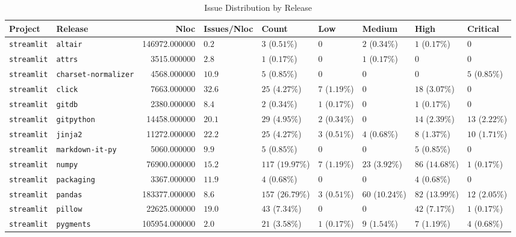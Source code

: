 \begin{table}
\caption{Issue Distribution by Release}
\label{tab:issue-release-distribution}
\begin{tabular}{llrllllll}
\toprule
Project & Release & Nloc & Issues/Nloc & Count & Low & Medium & High & Critical \\
\midrule
\texttt{streamlit} & \texttt{altair} & 146972.000000 & $0.2$ & $3$ ($0.51\%$) & $0$ & $2$ ($0.34\%$) & $1$ ($0.17\%$) & $0$ \\
\texttt{streamlit} & \texttt{attrs} & 3515.000000 & $2.8$ & $1$ ($0.17\%$) & $0$ & $1$ ($0.17\%$) & $0$ & $0$ \\
\texttt{streamlit} & \texttt{charset-normalizer} & 4568.000000 & $10.9$ & $5$ ($0.85\%$) & $0$ & $0$ & $0$ & $5$ ($0.85\%$) \\
\texttt{streamlit} & \texttt{click} & 7663.000000 & $32.6$ & $25$ ($4.27\%$) & $7$ ($1.19\%$) & $0$ & $18$ ($3.07\%$) & $0$ \\
\texttt{streamlit} & \texttt{gitdb} & 2380.000000 & $8.4$ & $2$ ($0.34\%$) & $1$ ($0.17\%$) & $0$ & $1$ ($0.17\%$) & $0$ \\
\texttt{streamlit} & \texttt{gitpython} & 14458.000000 & $20.1$ & $29$ ($4.95\%$) & $2$ ($0.34\%$) & $0$ & $14$ ($2.39\%$) & $13$ ($2.22\%$) \\
\texttt{streamlit} & \texttt{jinja2} & 11272.000000 & $22.2$ & $25$ ($4.27\%$) & $3$ ($0.51\%$) & $4$ ($0.68\%$) & $8$ ($1.37\%$) & $10$ ($1.71\%$) \\
\texttt{streamlit} & \texttt{markdown-it-py} & 5060.000000 & $9.9$ & $5$ ($0.85\%$) & $0$ & $0$ & $5$ ($0.85\%$) & $0$ \\
\texttt{streamlit} & \texttt{numpy} & 76900.000000 & $15.2$ & $117$ ($19.97\%$) & $7$ ($1.19\%$) & $23$ ($3.92\%$) & $86$ ($14.68\%$) & $1$ ($0.17\%$) \\
\texttt{streamlit} & \texttt{packaging} & 3367.000000 & $11.9$ & $4$ ($0.68\%$) & $0$ & $0$ & $4$ ($0.68\%$) & $0$ \\
\texttt{streamlit} & \texttt{pandas} & 183377.000000 & $8.6$ & $157$ ($26.79\%$) & $3$ ($0.51\%$) & $60$ ($10.24\%$) & $82$ ($13.99\%$) & $12$ ($2.05\%$) \\
\texttt{streamlit} & \texttt{pillow} & 22625.000000 & $19.0$ & $43$ ($7.34\%$) & $0$ & $0$ & $42$ ($7.17\%$) & $1$ ($0.17\%$) \\
\texttt{streamlit} & \texttt{pygments} & 105954.000000 & $2.0$ & $21$ ($3.58\%$) & $1$ ($0.17\%$) & $9$ ($1.54\%$) & $7$ ($1.19\%$) & $4$ ($0.68\%$) \\

\end{tabular}
\end{table}
